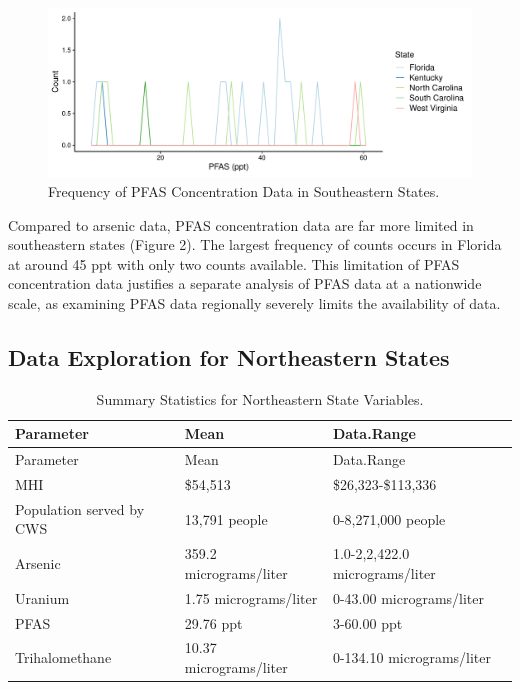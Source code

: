 \documentclass[12pt,]{article}
\begin{document}
\begin{figure}
\centering
\includegraphics{Project_Template_files/figure-latex/figs2-1.pdf}
\caption{Frequency of PFAS Concentration Data in Southeastern States.}
\end{figure}

Compared to arsenic data, PFAS concentration data are far more limited
in southeastern states (Figure 2). The largest frequency of counts
occurs in Florida at around 45 ppt with only two counts available. This
limitation of PFAS concentration data justifies a separate analysis of
PFAS data at a nationwide scale, as examining PFAS data regionally
severely limits the availability of data.

\newpage

\hypertarget{data-exploration-for-northeastern-states}{%
\subsection{Data Exploration for Northeastern
States}\label{data-exploration-for-northeastern-states}}

\begin{longtable}[]{@{}lll@{}}
\caption{Summary Statistics for Northeastern State
Variables.}\tabularnewline
\toprule
Parameter & Mean & Data.Range\tabularnewline
\midrule
\endfirsthead
\toprule
Parameter & Mean & Data.Range\tabularnewline
\midrule
\endhead
MHI & \$54,513 & \$26,323-\$113,336\tabularnewline
Population served by CWS & 13,791 people & 0-8,271,000
people\tabularnewline
Arsenic & 359.2 micrograms/liter & 1.0-2,2,422.0
micrograms/liter\tabularnewline
Uranium & 1.75 micrograms/liter & 0-43.00
micrograms/liter\tabularnewline
PFAS & 29.76 ppt & 3-60.00 ppt\tabularnewline
Trihalomethane & 10.37 micrograms/liter & 0-134.10
micrograms/liter\tabularnewline
\bottomrule
\end{longtable}

\begin{quote}
\end{quote}
\end{document}
